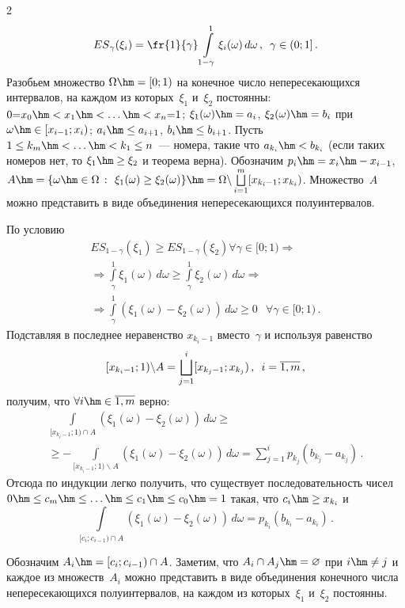 \begin{multicols}{2}
\noindent
$$
{ES}_\gamma(\xi_i) = \fr{1}{\gamma} 
\int\limits_{1-\gamma}^1{\xi_i(\omega)\,d\omega}\,,\enskip \gamma\in (0;1]\,.
$$
Разобьем множество $\Omega\hm=[0;1)$ на конечное число непересекающихся
интервалов, на каждом из которых~$\xi_1$ и~$\xi_2$ постоянны:
$0{=}x_0\hm<x_1\hm<\ldots\hm<x_n{=}1$;
$\xi_1(\omega)\hm=a_i$, $\xi_2(\omega)\hm=b_i$ при
$\omega\hm\in [x_{i-1};x_i)$; $a_i\hm\le a_{i+1}$, $b_i \hm\le b_{i+1}$.
Пусть $1\le k_m \hm< \ldots \hm< k_1\le n$~--- номера, такие что $a_{k_i}
\hm< b_{k_i}$ (если таких номеров нет, то $\xi_1\hm\ge\xi_2$ и теорема
верна). Обозначим $p_i\hm=x_i\hm-x_{i-1}$,
$A\hm=\Set{\omega\hm\in\Omega}{\xi_1(\omega)\ge\xi_2(\omega)}\hm=\Omega
\backslash \bigsqcup\limits_{i=1}^m [x_{k_i-1};x_{k_i})$.
Множество~$A$ можно представить в виде объединения непересекающихся полуинтервалов.

По условию
\begin{multline*}
{ES}_{1-\gamma}(\xi_1) \ge {ES}_{1-\gamma}(\xi_2) \forall \gamma\in [0;1) \Rightarrow{}\\
{}\Rightarrow
\int\limits_\gamma^1 \xi_1(\omega)\,d\omega \ge \int\limits_\gamma^1 \xi_2(\omega)\,d\omega \Rightarrow {}\\
{}
\Rightarrow \int\limits_\gamma^1 (\xi_1(\omega)-\xi_2(\omega))\,d\omega \ge 0 \; \ \ \forall \gamma \in [0;1)\,.
\end{multline*}
Подставляя в последнее неравенство $x_{k_i-1}$ вмес\-то~$\gamma$ и используя равенство
$$
[x_{k_i-1};1) \backslash A = \bigsqcup\limits_{j=1}^{i} [x_{k_j-1};x_{k_j})\,,\enskip
i=\overline{1,m}\,,
$$
получим, что $\forall i \hm\in \overline{1,m}$ верно:
\begin{multline*}
\int\limits_{[x_{k_i-1};1)\cap A}(\xi_1(\omega)-\xi_2(\omega))\,d\omega \ge{}\\
{}\ge
-\!\!\! \int\limits_{[x_{k_i-1};1)\backslash A}\!\!\!(\xi_1(\omega)-\xi_2(\omega))\,d\omega =
\sum\limits_{j=1}^{i} p_{k_j}(b_{k_j} - a_{k_j})\,.
\end{multline*}
Отсюда по индукции легко получить, что существует
последовательность чисел
$0\hm \le c_m \hm\le \ldots \hm\le c_1 \hm\le c_0 \hm= 1$ такая, что $c_i\hm\ge
x_{k_i}$ и 
$$
\int\limits_{[c_i;c_{i-1})\cap A}(\xi_1(\omega)-\xi_2(\omega))\,d\omega
=p_{k_i}(b_{k_i} - a_{k_i})\,.
$$

Обозначим $A_i \hm= [c_i;c_{i-1}) \cap A$. Заметим, что
$A_i\cap A_j \hm= \varnothing$ при $i\hm\neq j$ и каждое из множеств~$A_i$ 
можно представить в виде объединения конечного чис\-ла
непересекающихся полуинтервалов, на каждом из которых~$\xi_1$ и~$\xi_2$ постоянны.


\end{multicols}
